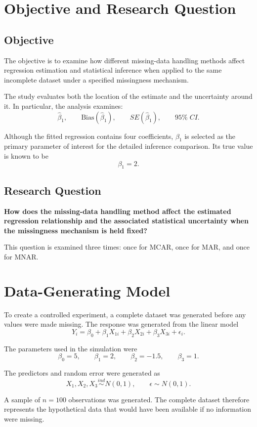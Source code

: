 \documentclass[11pt,a4paper]{article}
\begin{document}
\section{Objective and Research Question}
\subsection{Objective}
The objective is to examine how different missing-data handling methods affect regression estimation and statistical inference when applied to the same incomplete dataset under a specified missingness mechanism.

The study evaluates both the location of the estimate and the uncertainty around it. In particular, the analysis examines:
\[
\hat{\beta}_1,
\qquad
\text{Bias}(\hat{\beta}_1),
\qquad
SE(\hat{\beta}_1),
\qquad
95\%\;CI.
\]

Although the fitted regression contains four coefficients, $\beta_1$ is selected as the primary parameter of interest for the detailed inference comparison. Its true value is known to be
\[
\boxed{\beta_1=2}.
\]

\subsection{Research Question}
\textbf{How does the missing-data handling method affect the estimated regression relationship and the associated statistical uncertainty when the missingness mechanism is held fixed?}

This question is examined three times: once for MCAR, once for MAR, and once for MNAR.

\section{Data-Generating Model}
To create a controlled experiment, a complete dataset was generated before any values were made missing. The response was generated from the linear model
\[
Y_i = \beta_0 + \beta_1X_{1i} + \beta_2X_{2i} + \beta_3X_{3i} + \epsilon_i.
\]

The parameters used in the simulation were
\[
\beta_0=5,\qquad
\beta_1=2,\qquad
\beta_2=-1.5,\qquad
\beta_3=1.
\]

The predictors and random error were generated as
\[
X_1,X_2,X_3\overset{ind}{\sim}N(0,1),
\qquad
\epsilon\sim N(0,1).
\]

A sample of $n=100$ observations was generated. The complete dataset therefore represents the hypothetical data that would have been available if no information were missing.
\end{document}
